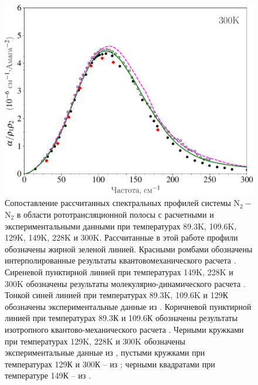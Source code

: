 \begin{figure}[H]
    \includegraphics[width=0.49\linewidth]{./pictures/polyatom_spectra/300K_russian-crop.pdf}
    \caption{Сопоставление рассчитанных спектральных профилей системы N$_2-$N$_2$ в области рототрансляционной полосы с расчетными и экспериментальными данными при температурах 89.3K, 109.6K, 129K, 149K, 228K и 300K. Рассчитанные в этой работе профили обозначены жирной зеленой линией. Красными ромбами обозначены интерполированные результаты квантовомеханического расчета \cite{karman2015}. Сиреневой пунктирной линией при температурах 149K, 228K и 300K обозначены результаты молекулярно-динамического расчета \cite{bussery2014}. Тонкой синей линией при температурах 89.3K, 109.6K и 129К обозначены экспериментальные данные из \cite{karman2019}. Коричневой пунктирной линией при температурах 89.3К и 109.6К обозначены результаты изотропного квантово-механического расчета \cite{borysow1986}. Черными кружками при температурах 129K, 228K и 300K обозначены экспериментальные данные из \cite{stone1984}, пустыми кружками при температурах 129К и 300К -- из \cite{buontempo1975}; черными квадратами при температуре 149К -- из \cite{dagg1985}. }  
    \label{fig:n2n2-spectra}
\end{figure}

